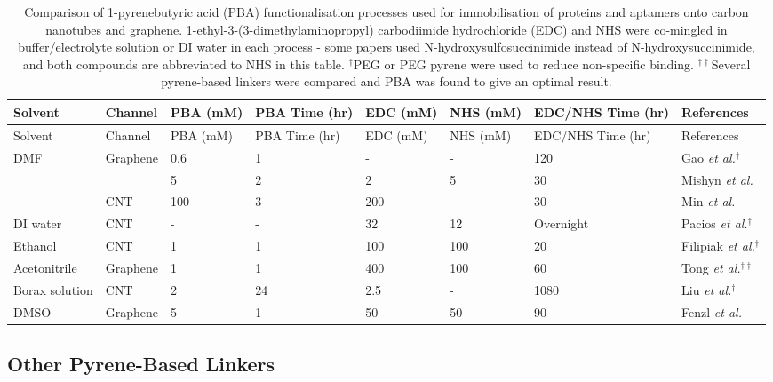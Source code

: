 \documentclass[
  a4paper,
]{scrbook}
\begin{document}
\hypertarget{tbl-pba-functionalisation}{}
\begin{longtable}[]{@{}llllllll@{}}
\caption{\label{tbl-pba-functionalisation}Comparison of 1-pyrenebutyric
acid (PBA) functionalisation processes used for immobilisation of
proteins and aptamers onto carbon nanotubes and graphene.
1-ethyl-3-(3-dimethylaminopropyl) carbodiimide hydrochloride (EDC) and
NHS were co-mingled in buffer/electrolyte solution or DI water in each
process - some papers used N-hydroxysulfosuccinimide instead of
N-hydroxysuccinimide, and both compounds are abbreviated to NHS in this
table. \(^†\)PEG or PEG pyrene were used to reduce non-specific binding.
\(^{††}\)Several pyrene-based linkers were compared and PBA was found to
give an optimal result.}\tabularnewline
\toprule()
Solvent & Channel & PBA (mM) & PBA Time (hr) & EDC (mM) & NHS (mM) &
EDC/NHS Time (hr) & References \\
\midrule()
\endfirsthead
\toprule()
Solvent & Channel & PBA (mM) & PBA Time (hr) & EDC (mM) & NHS (mM) &
EDC/NHS Time (hr) & References \\
\midrule()
\endhead
DMF & Graphene & 0.6 & 1 & - & - & 120 & Gao \textit{et al.}\(^†\)
\cite{Gao2016} \\
& & 5 & 2 & 2 & 5 & 30 & Mishyn \textit{et al.} \cite{Mishyn2022} \\
& CNT & 100 & 3 & 200 & - & 30 & Min \textit{et al.} \cite{Min2012} \\
DI water & CNT & - & - & 32 & 12 & Overnight & Pacios
\textit{et al.}\(^†\) \cite{Pacios2012} \\
Ethanol & CNT & 1 & 1 & 100 & 100 & 20 & Filipiak \textit{et al.}\(^†\)
\cite{Filipiak2018} \\
Acetonitrile & Graphene & 1 & 1 & 400 & 100 & 60 & Tong
\textit{et al.}\(^{††}\) \cite{Tong2020} \\
Borax solution & CNT & 2 & 24 & 2.5 & - & 1080 & Liu
\textit{et al.}\(^†\) \cite{Liu2011} \\
DMSO & Graphene & 5 & 1 & 50 & 50 & 90 & Fenzl \textit{et al.}
\cite{Fenzl2017} \\
\bottomrule()
\end{longtable}

\newpage
{}

\hypertarget{sec-other-linkers}{%
\subsection{Other Pyrene-Based Linkers}\label{sec-other-linkers}}
\end{document}
